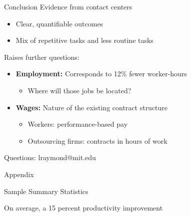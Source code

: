 \documentclass[aspectratio=169,t,11pt,table]{beamer}
\begin{document}
\begin{frame}{Conclusion}
\alert{Evidence from contact centers}
\begin{itemize}
\item Clear, quantifiable outcomes  
\item Mix of repetitive tasks and less routine tasks
\end{itemize}

\alert{Raises further questions:}
\begin{itemize}
\item \textbf{Employment:} Corresponds to 12\% fewer worker-hours
\begin{itemize}
    \item Where will those jobs be located?
\end{itemize}
\item \textbf{Wages:} Nature of the existing contract structure
\begin{itemize}
    \item Workers: performance-based pay
    \item Outsourcing firms: contracts in hours of work
\end{itemize}
\end{itemize}

\bigskip
\textcolor{raspberry}{Questions:} lraymond@mit.edu
\end{frame}


\appendix
\begin{frame}{Appendix}
  \thispagestyle{empty}
\end{frame}


\begin{frame}{Sample Summary Statistics}\label{summary-stats}
\begin{table}
\scalebox{.70}{\makebox[\linewidth]{}}
    \caption{Sample Summary Statistics}
    \label{tab:summarystats}
\end{table}
\end{frame}

\begin{frame}[label=dd-table]{On average, a 15 percent productivity improvement}
\begin{figure}[ht!]
\begin{center}
\scalebox{.6}{\makebox[\linewidth]{}}
\end{center}
\end{figure}   
\hyperlink{dd-figure}{}
\end{frame}
\end{document}

